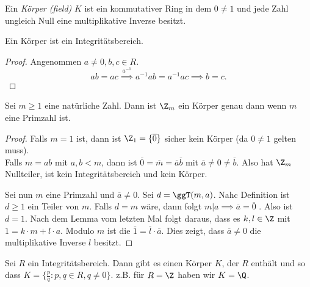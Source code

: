 \begin{definition}
	Ein \emph{Körper (field)} $K$ ist ein kommutativer Ring in dem $0 \neq 1$ und jede Zahl ungleich Null eine multiplikative Inverse besitzt.
\end{definition}

\begin{lemma}
	Ein Körper ist ein Integritätsbereich.
\end{lemma}

\begin{proof}
	Angenommen $a \neq  0, b,c \in R$.
	\[
	ab = ac \stackrel{a^{-1}}{\implies} a^{-1} a b = a^{-1} a c \implies b = c
	.\] 
\end{proof}

\begin{proposition}
	Sei $m \geq 1$ eine natürliche Zahl.
	Dann ist $\Z_{m}$ ein Körper genau dann wenn $m$ eine Primzahl ist.
\end{proposition}

\begin{proof}
	Falls $m=1$ ist, dann ist $\Z_{1} = \{\overline{0}\}$ sicher kein Körper (da $0 \neq 1$ gelten muss).\\
	Falls $m = ab$ mit $a,b < m$, dann ist $\overline{0} = \overline{m} = \overline{a} \overline{b}$ mit $\overline{a} \neq 0 \neq \overline{b}$.
	Also hat $\Z_{m}$ Nullteiler, ist kein Integritätsbereich und kein Körper.

	Sei nun $m$ eine Primzahl und $\overline{a} \neq 0$. Sei $d = \ggT(m,a)$.
	Nahc Definition ist $d \geq 1$ ein Teiler von $m$.
	Falls $d = m$ wäre, dann folgt $m \vert a \implies \overline{a} = \overline{0}$ \contra.
	Also ist $d = 1$. Nach dem Lemma vom letzten Mal folgt daraus, 
	dass es $k,l \in \Z$ mit $1 = k \cdot m + l \cdot a$. Modulo $m$ ist die $\overline{1} = \overline{l} \cdot \overline{a}$.
	Dies zeigt, dass $\overline{a} \neq 0$ die multiplikative Inverse $l$ besitzt.
\end{proof}

\begin{theorem}[Quotientenkörper (S.38)]
	Sei $R$ ein Integritätsbereich. Dann gibt es einen Körper $K$, der $R$ enthält und so dass $K = \{\frac{p}{q}: p,q \in R , q \neq 0\}$.
	z.B. für $R = \Z$ haben wir $K = \Q$.
\end{theorem}

